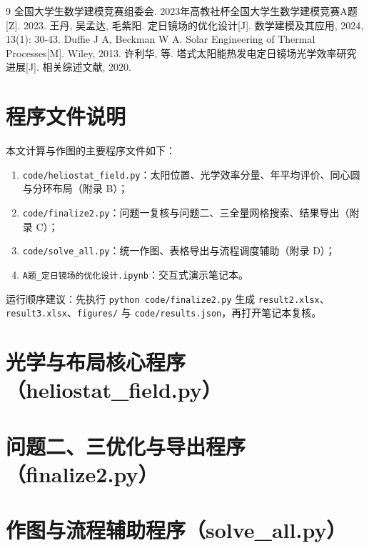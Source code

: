 \documentclass[withoutpreface,bwprint]{cumcmthesis}
\begin{document}
\newpage
\begin{thebibliography}{9}
 全国大学生数学建模竞赛组委会. 2023年高教社杯全国大学生数学建模竞赛A题[Z]. 2023.
 王丹, 吴孟达, 毛紫阳. 定日镜场的优化设计[J]. 数学建模及其应用, 2024, 13(1): 30-43.
 Duffie J A, Beckman W A. Solar Engineering of Thermal Processes[M]. Wiley, 2013.
 许利华, 等. 塔式太阳能热发电定日镜场光学效率研究进展[J]. 相关综述文献, 2020.
\end{thebibliography}

\newpage
\appendix
\section{程序文件说明}
本文计算与作图的主要程序文件如下：
\begin{enumerate}[leftmargin=2em]
  \item \texttt{code/heliostat\_field.py}：太阳位置、光学效率分量、年平均评价、同心圆与分环布局（附录 B）；
  \item \texttt{code/finalize2.py}：问题一复核与问题二、三全量网格搜索、结果导出（附录 C）；
  \item \texttt{code/solve\_all.py}：统一作图、表格导出与流程调度辅助（附录 D）；
  \item \texttt{A题\_定日镜场的优化设计.ipynb}：交互式演示笔记本。
\end{enumerate}
运行顺序建议：先执行 \texttt{python code/finalize2.py} 生成 \texttt{result2.xlsx}、\texttt{result3.xlsx}、\texttt{figures/} 与 \texttt{code/results.json}，再打开笔记本复核。

\newpage
\section{光学与布局核心程序（heliostat\_field.py）}


\newpage
\section{问题二、三优化与导出程序（finalize2.py）}


\newpage
\section{作图与流程辅助程序（solve\_all.py）}

\end{document}
